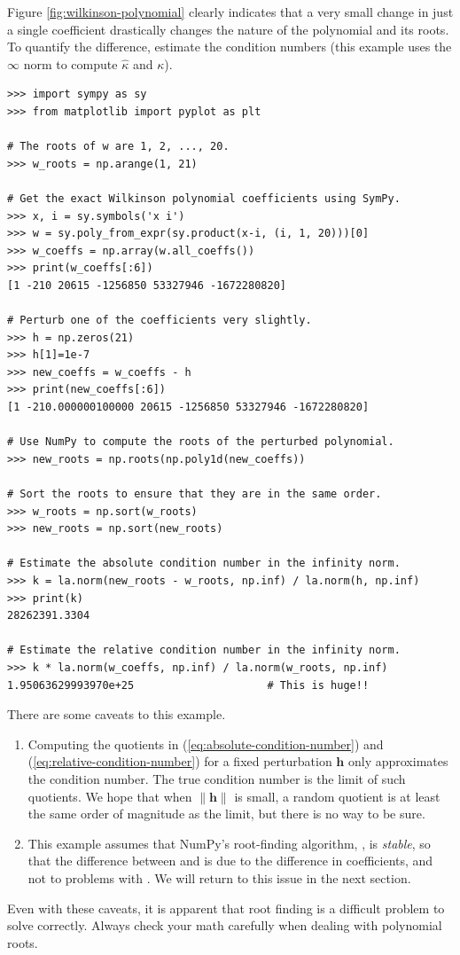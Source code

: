 Figure \ref{fig:wilkinson-polynomial} clearly indicates that a very small change in just a single coefficient drastically changes the nature of the polynomial and its roots.
To quantify the difference, estimate the condition numbers (this example uses the $\infty$ norm to compute $\hat{\kappa}$ and $\kappa$).

\begin{lstlisting}
>>> import sympy as sy
>>> from matplotlib import pyplot as plt

# The roots of w are 1, 2, ..., 20.
>>> w_roots = np.arange(1, 21)

# Get the exact Wilkinson polynomial coefficients using SymPy.
>>> x, i = sy.symbols('x i')
>>> w = sy.poly_from_expr(sy.product(x-i, (i, 1, 20)))[0]
>>> w_coeffs = np.array(w.all_coeffs())
>>> print(w_coeffs[:6])
[1 -210 20615 -1256850 53327946 -1672280820]

# Perturb one of the coefficients very slightly.
>>> h = np.zeros(21)
>>> h[1]=1e-7
>>> new_coeffs = w_coeffs - h
>>> print(new_coeffs[:6])
[1 -210.000000100000 20615 -1256850 53327946 -1672280820]

# Use NumPy to compute the roots of the perturbed polynomial.
>>> new_roots = np.roots(np.poly1d(new_coeffs))

# Sort the roots to ensure that they are in the same order.
>>> w_roots = np.sort(w_roots)
>>> new_roots = np.sort(new_roots)

# Estimate the absolute condition number in the infinity norm.
>>> k = la.norm(new_roots - w_roots, np.inf) / la.norm(h, np.inf)
>>> print(k)
28262391.3304

# Estimate the relative condition number in the infinity norm.
>>> k * la.norm(w_coeffs, np.inf) / la.norm(w_roots, np.inf)
1.95063629993970e+25                     # This is huge!!
\end{lstlisting}

There are some caveats to this example.
\begin{enumerate}
\item Computing the quotients in (\ref{eq:absolute-condition-number}) and (\ref{eq:relative-condition-number}) for a fixed perturbation $\mathbf{h}$ only approximates the condition number.
The true condition number is the limit of such quotients.
We hope that when $\|\mathbf{h}\|$ is small, a random quotient is at least the same order of magnitude as the limit, but there is no way to be sure.

\item This example assumes that NumPy's root-finding algorithm, , is \emph{stable}, so that the difference between  and  is due to the difference in coefficients, and not to problems with .
We will return to this issue in the next section.
\end{enumerate}
Even with these caveats, it is apparent that root finding is a difficult problem to solve correctly.
Always check your math carefully when dealing with polynomial roots.

